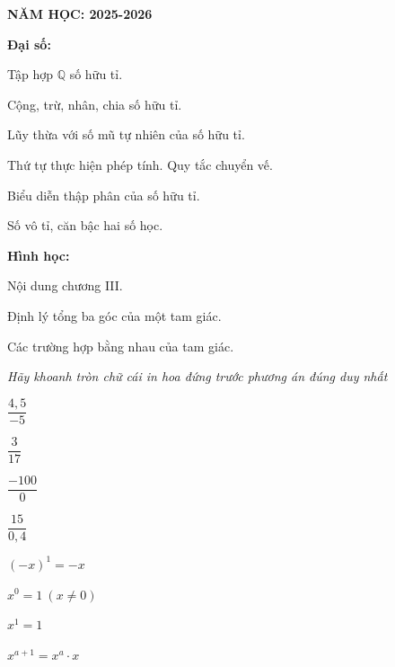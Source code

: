 \documentclass[14pt,a4paper]{extbook}
\begin{document}
\pagestyle{sgkstyle}


\begin{center}
    \textbf{\large NĂM HỌC: 2025-2026}
\end{center}

\begin{dsSao}
    \item \textbf{Đại số:}
    \begin{dsTrangTri1}
        \item Tập hợp $\mathbb{Q}$ số hữu tỉ.
        \item Cộng, trừ, nhân, chia số hữu tỉ.
        \item Lũy thừa với số mũ tự nhiên của số hữu tỉ.
        \item Thứ tự thực hiện phép tính. Quy tắc chuyển vế.
        \item Biểu diễn thập phân của số hữu tỉ.
        \item Số vô tỉ, căn bậc hai số học.
    \end{dsTrangTri1}
    \item \textbf{Hình học:}
    \begin{dsTrangTri1}
        \item Nội dung chương III.
        \item Định lý tổng ba góc của một tam giác.
        \item Các trường hợp bằng nhau của tam giác.
    \end{dsTrangTri1}
\end{dsSao}

\textit{Hãy khoanh tròn chữ cái in hoa đứng trước phương án đúng duy nhất}

\begin{tracnghiem4}
    \item $\dfrac{4,5}{-5}$
    \item $\dfrac{3}{17}$
    \item $\dfrac{-100}{0}$
    \item $\dfrac{15}{0,4}$
\end{tracnghiem4}

\begin{tracnghiem4}
    \item $(-x)^{1}=-x$
    \item $x^{0}=1\ (x\ne0)$
    \item $x^{1}=1$
    \item $x^{a+1}=x^{a}\cdot x$
\end{tracnghiem4}
\end{document}
